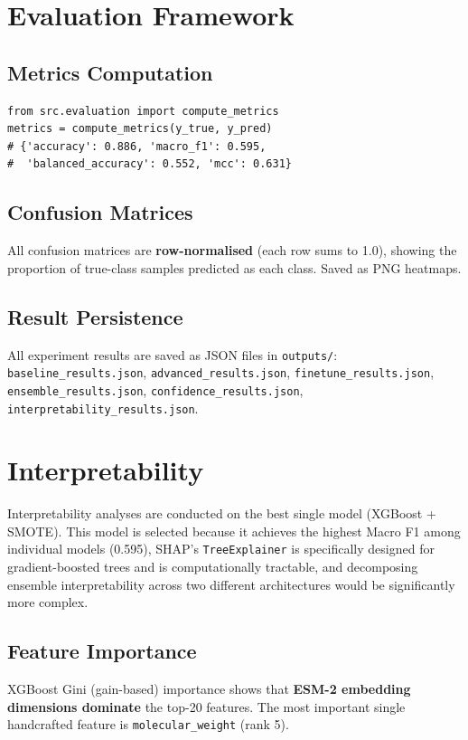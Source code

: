 \documentclass[11pt,a4paper]{article}
\begin{document}
\section{Evaluation Framework}
\subsection{Metrics Computation}
\begin{verbatim}
from src.evaluation import compute_metrics
metrics = compute_metrics(y_true, y_pred)
# {'accuracy': 0.886, 'macro_f1': 0.595,
#  'balanced_accuracy': 0.552, 'mcc': 0.631}
\end{verbatim}

\subsection{Confusion Matrices}
All confusion matrices are \textbf{row-normalised} (each row sums to 1.0), showing the
proportion of true-class samples predicted as each class. Saved as PNG heatmaps.

\subsection{Result Persistence}
All experiment results are saved as JSON files in \texttt{outputs/}:
\texttt{baseline\_results.json}, \texttt{advanced\_results.json},
\texttt{finetune\_results.json}, \texttt{ensemble\_results.json},
\texttt{confidence\_results.json}, \texttt{interpretability\_results.json}.

\section{Interpretability}
Interpretability analyses are conducted on the best single model (XGBoost + SMOTE).
This model is selected because it achieves the highest Macro F1 among individual models (0.595),
SHAP's \texttt{TreeExplainer} is specifically designed for gradient-boosted trees and is
computationally tractable, and decomposing ensemble interpretability across two different
architectures would be significantly more complex.

\subsection{Feature Importance}
XGBoost Gini (gain-based) importance shows that \textbf{ESM-2 embedding dimensions dominate}
the top-20 features.
The most important single handcrafted feature is \texttt{molecular\_weight} (rank 5).
\end{document}
